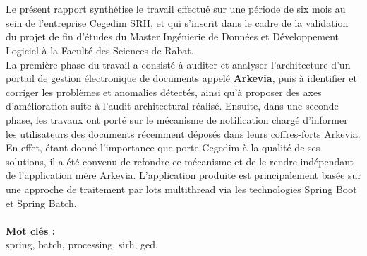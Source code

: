 {}
\noindent \section*{\abstractname}
	Le présent rapport synthétise le travail effectué sur une période de six mois au sein de l'entreprise Cegedim SRH, et qui s'inscrit dans le cadre de la validation du projet de fin d'études du Master Ingénierie de Données et Développement Logiciel à la Faculté des Sciences de Rabat.\\
	
	La première phase du travail a consisté à auditer et analyser l'architecture d'un portail de gestion électronique de documents appelé \textbf{Arkevia}, puis à identifier et corriger les problèmes et anomalies détectés, ainsi qu'à proposer des axes d'amélioration suite à l'audit architectural réalisé. Ensuite, dans une seconde phase, les travaux ont porté sur le mécanisme de notification chargé d'informer les utilisateurs des documents récemment déposés dans leurs coffres-forts Arkevia. En effet, étant donné l’importance que porte Cegedim à la qualité de ses solutions, il a été convenu de refondre ce mécanisme et de le rendre indépendant de l'application mère Arkevia. L'application produite est principalement basée sur une approche de traitement par lots multithread via les technologies Spring Boot et Spring Batch.
	\\\\
	\textbf{Mot clés :}\\
	spring, batch, processing, sirh, ged.
	\newpage